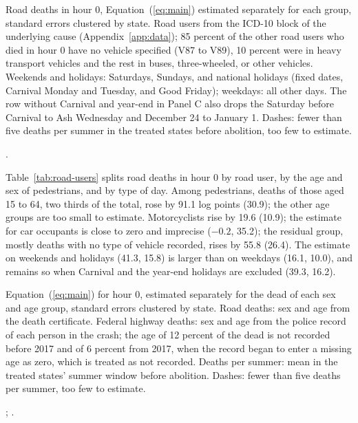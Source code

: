 \begin{table}[tbp]
  \caption{Who Dies in the Hour That Turned Dark}
  \label{tab:road-users}
  \centering\footnotesize\setlength{\tabcolsep}{5pt}
  
  \begin{tablenotes}[Notes]
  Road deaths in hour 0, Equation~(\ref{eq:main}) estimated separately for each group, standard errors clustered by state. Road users from the ICD-10 block of the underlying cause (Appendix~\ref{app:data}); 85 percent of the other road users who died in hour 0 have no vehicle specified (V87 to V89), 10 percent were in heavy transport vehicles and the rest in buses, three-wheeled, or other vehicles. Weekends and holidays: Saturdays, Sundays, and national holidays (fixed dates, Carnival Monday and Tuesday, and Good Friday); weekdays: all other days. The row without Carnival and year-end in Panel C also drops the Saturday before Carnival to Ash Wednesday and December 24 to January 1. Dashes: fewer than five deaths per summer in the treated states before abolition, too few to estimate.
  \end{tablenotes}
  \begin{tablenotes}[Source]
  \citet{datasus2025sim}.
  \end{tablenotes}
\end{table}

Table~\ref{tab:road-users} splits road deaths in hour 0 by road user, by the age and sex of pedestrians, and by type of day. Among pedestrians, deaths of those aged 15 to 64, two thirds of the total, rose by 91.1 log points (30.9); the other age groups are too small to estimate. Motorcyclists rise by 19.6 (10.9); the estimate for car occupants is close to zero and imprecise ($-0.2$, 35.2); the residual group, mostly deaths with no type of vehicle recorded, rises by 55.8 (26.4). The estimate on weekends and holidays (41.3, 15.8) is larger than on weekdays (16.1, 10.0), and remains so when Carnival and the year-end holidays are excluded (39.3, 16.2).

\begin{table}[tbp]
  \caption{Sex and Age of the Dead in the Hour That Turned Dark}
  \label{tab:sex-age}
  \centering\footnotesize\setlength{\tabcolsep}{3pt}
  
  \begin{tablenotes}[Notes]
  Equation~(\ref{eq:main}) for hour 0, estimated separately for the dead of each sex and age group, standard errors clustered by state. Road deaths: sex and age from the death certificate. Federal highway deaths: sex and age from the police record of each person in the crash; the age of 12 percent of the dead is not recorded before 2017 and of 6 percent from 2017, when the record began to enter a missing age as zero, which is treated as not recorded. Deaths per summer: mean in the treated states' summer window before abolition. Dashes: fewer than five deaths per summer, too few to estimate.
  \end{tablenotes}
  \begin{tablenotes}[Sources]
  \citet{datasus2025sim}; \citet{prf2025dados, prf2025pessoas}.
  \end{tablenotes}
\end{table}

